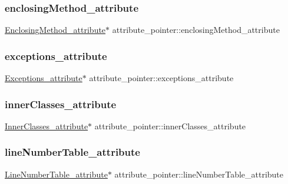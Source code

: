 \subsubsection{\texorpdfstring{enclosing\+Method\+\_\+attribute}{enclosingMethod\_attribute}}
{\footnotesize\ttfamily \hyperlink{struct_enclosing_method__attribute}{Enclosing\+Method\+\_\+attribute}$\ast$ attribute\+\_\+pointer\+::enclosing\+Method\+\_\+attribute}

\hypertarget{unionattribute__pointer_a1d45eae92b5683e363e39016bd04d528}{}\label{unionattribute__pointer_a1d45eae92b5683e363e39016bd04d528} 
\subsubsection{\texorpdfstring{exceptions\+\_\+attribute}{exceptions\_attribute}}
{\footnotesize\ttfamily \hyperlink{struct_exceptions__attribute}{Exceptions\+\_\+attribute}$\ast$ attribute\+\_\+pointer\+::exceptions\+\_\+attribute}

\hypertarget{unionattribute__pointer_a053d5fd49a841c9710aacb6541b01976}{}\label{unionattribute__pointer_a053d5fd49a841c9710aacb6541b01976} 
\subsubsection{\texorpdfstring{inner\+Classes\+\_\+attribute}{innerClasses\_attribute}}
{\footnotesize\ttfamily \hyperlink{struct_inner_classes__attribute}{Inner\+Classes\+\_\+attribute}$\ast$ attribute\+\_\+pointer\+::inner\+Classes\+\_\+attribute}

\hypertarget{unionattribute__pointer_aa8a3d8595ef1ec23cd58404b007970db}{}\label{unionattribute__pointer_aa8a3d8595ef1ec23cd58404b007970db} 
\subsubsection{\texorpdfstring{line\+Number\+Table\+\_\+attribute}{lineNumberTable\_attribute}}
{\footnotesize\ttfamily \hyperlink{struct_line_number_table__attribute}{Line\+Number\+Table\+\_\+attribute}$\ast$ attribute\+\_\+pointer\+::line\+Number\+Table\+\_\+attribute}

